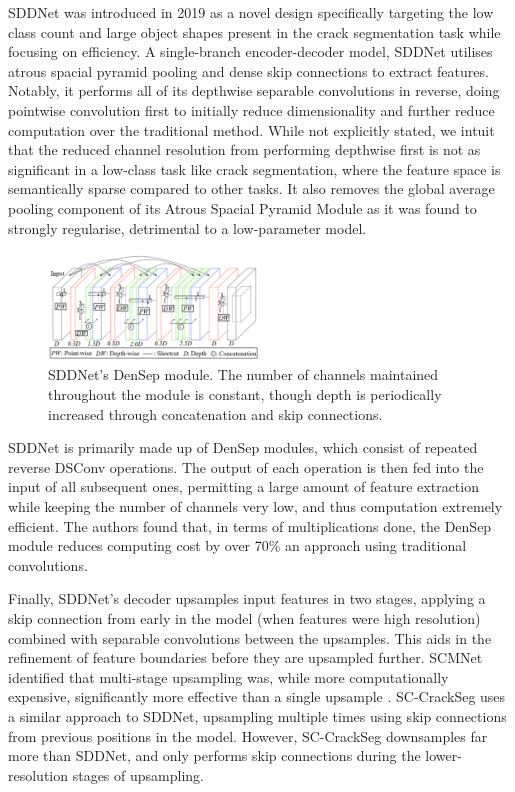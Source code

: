 \documentclass[a4paper,12pt]{report}
\begin{document}
SDDNet was introduced in 2019 as a novel design specifically targeting the low class count and large object shapes present in the crack segmentation task while focusing on efficiency. A single-branch encoder-decoder model, SDDNet utilises atrous spacial pyramid pooling and dense skip connections to extract features. Notably, it performs all of its depthwise separable convolutions in reverse, doing pointwise convolution first to initially reduce dimensionality and further reduce computation over the traditional method. While not explicitly stated, we intuit that the reduced channel resolution from performing depthwise first is not as significant in a low-class task like crack segmentation, where the feature space is semantically sparse compared to other tasks. It also removes the global average pooling component of its Atrous Spacial Pyramid Module as it was found to strongly regularise, detrimental to a low-parameter model.

\begin{figure}[ht!]
    \centering
    \includegraphics[width=0.5\textwidth]{res/sddnet-densep-module.png}
    \caption{SDDNet's \cite{choi_sddnet_2019} DenSep module. The number of channels maintained throughout the module is constant, though depth is periodically increased through concatenation and skip connections.}
    \label{fig:densep-module}
\end{figure}

SDDNet is primarily made up of DenSep modules, which consist of repeated reverse DSConv operations. The output of each operation is then fed into the input of all subsequent ones, permitting a large amount of feature extraction while keeping the number of channels very low, and thus computation extremely efficient. The authors found that, in terms of multiplications done, the DenSep module reduces computing cost by over 70\% an approach using traditional convolutions.

Finally, SDDNet's decoder upsamples input features in two stages, applying a skip connection from early in the model (when features were high resolution) combined with separable convolutions between the upsamples. This aids in the refinement of feature boundaries before they are upsampled further. SCMNet identified that multi-stage upsampling was, while more computationally expensive, significantly more effective than a single upsample \cite{singha_scmnet_2021}. SC-CrackSeg uses a similar approach to SDDNet, upsampling multiple times using skip connections from previous positions in the model. However, SC-CrackSeg downsamples far more than SDDNet, and only performs skip connections during the lower-resolution stages of upsampling.
\end{document}

